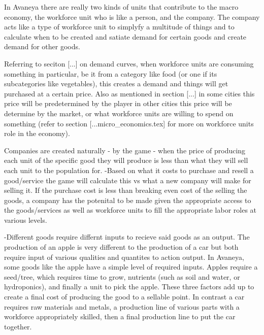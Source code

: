 


In Avaneya there are really two kinds of units that contribute to the macro economy, the workforce unit who is like a person, and the company. The company acts like a type of workforce unit to simplyfy a multitude of things and to calculate when to be created and satiate demand for certain goods and create demand for other goods. 


Referring to seciton [...] on demand curves, when workforce units are consuming something in particular, be it from a category like food (or one if its subcategories like vegetables), this creates a demand and things will get purchased at a certain price. Also as mentioned in section [...] in some cities this price will be predetermined by the player in other cities this price will be determine by the market, or what workforce units are willing to spend on something (refer to section [...micro_economics.tex] for more on workforce units role in the economy).

Companies are created naturally - by the game - when the price of producing each unit of the specific good they will produce is less than what they will sell each unit to the population for.
-Based on what it costs to purchase and resell a good/service the game will calculate this vs what a new company will make for selling it. If the purchase cost is less than breaking even cost of the selling the goods, a company has the potenital to be made given the appropriate access to the goods/services as well as workforce units to fill the appropriate labor roles at various levels.

-Different goods require differnt inputs to recieve said goods as an output. The production of an apple is very different to the production of a car but both require input of various qualities and quantites to action output. In Avaneya, some goods like the apple have a simple level of required inputs. Apples require a seed/tree, which requires time to grow, nutrients (such as soil and water, or hydroponics), and finally a unit to pick the apple. These three factors add up to create a final cost of producing the good to a sellable point. In contrast a car requires raw materials and metals, a production line of various parts with a workforce appropriately skilled, then a final production line to put the car together. 

